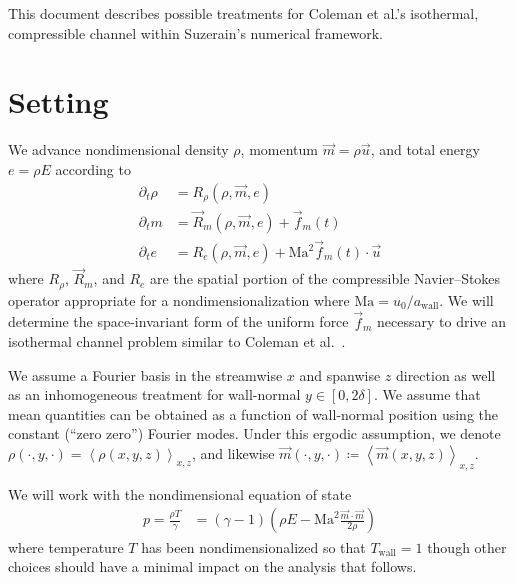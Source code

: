 \documentclass[letterpaper,11pt,nointlimits,reqno]{amsart}
\begin{document}
This document describes possible treatments for Coleman et al.'s isothermal,
compressible channel within Suzerain's numerical framework.

\section{Setting}

We advance nondimensional density $\rho$, momentum $\vec{m}=\rho{}\vec{u}$, and
total energy $e = \rho{}{E}$ according to
\begin{subequations}
\begin{align}
  \partial_{t} \rho{} &= R_{\rho}\!\left(\rho,\vec{m},e\right)
  \\
  \partial_{t} m      &= \vec{R}_{m}\!\left(\rho,\vec{m},e\right)
                       + \vec{f}_{m}(t)
  \\
  \partial_{t} e      &= R_{e}\!\left(\rho,\vec{m},e\right)
                       + \mbox{Ma}^{2} \vec{f}_{m}(t) \cdot \vec{u}
\end{align}
\end{subequations}
where $R_{\rho}$, $\vec{R}_{m}$, and $R_{e}$ are the spatial portion of the
compressible Navier--Stokes operator appropriate for a nondimensionalization
where $\mbox{Ma}=u_{0}/a_\text{wall}$.  We will determine the space-invariant
form of the uniform force $\vec{f}_{m}$ necessary to drive an isothermal
channel problem similar to Coleman et al.~\cite{Coleman1995Numerical}.

We assume a Fourier basis in the streamwise $x$ and spanwise $z$ direction as
well as an inhomogeneous treatment for wall-normal
$y\in\left[0,2\delta\right]$.  We assume that mean quantities can be obtained
as a function of wall-normal position using the constant (``zero zero'')
Fourier modes.  Under this ergodic assumption, we denote
$\rho\!\left(\cdot,y,\cdot\right) = \left<\rho\left(x,y,z\right)\right>_{x,z}$,
and likewise $\vec{m}\!\left(\cdot,y,\cdot\right) \coloneqq
\left<\vec{m}\left(x,y,z\right)\right>_{x,z}$.

We will work with the
nondimensional equation of state
\begin{align}
  p  = \frac{\rho{}T}{\gamma}
    &= \left(\gamma-1\right) \left(
          \rho{E} - \mbox{Ma}^2\frac{\vec{m}\cdot\vec{m}}{2\rho}
        \right)
\end{align}
where temperature $T$ has been nondimensionalized so that $T_\text{wall}=1$
though other choices should have a minimal impact on the analysis that follows.
\end{document}
